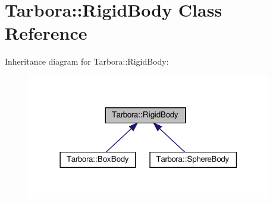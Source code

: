 \hypertarget{classTarbora_1_1RigidBody}{}\section{Tarbora\+:\+:Rigid\+Body Class Reference}
\label{classTarbora_1_1RigidBody}


Inheritance diagram for Tarbora\+:\+:Rigid\+Body\+:\nopagebreak
\begin{figure}[H]
\begin{center}
\leavevmode
\includegraphics[width=302pt]{classTarbora_1_1RigidBody__inherit__graph}
\end{center}
\end{figure}
